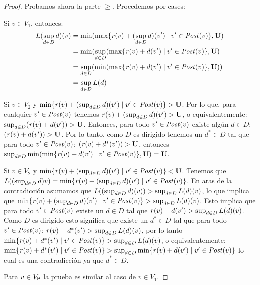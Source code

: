 \begin{proof}
    Probamos ahora la parte $\geq$.   Procedemos por cases:
    
    Si   $v \in V_1$,  entonces:
     \begin{align}
     L (\sup_{d \in D} d)(v) & = \min ( \max \{ \mathit{r}(v) + (\sup_{d \in D} d)(v') \mid v' \in \mathit{Post}(v)\},  \mathbf{U} ) \\                                                                                       
                                                     & =\min(  \sup_{d \in D} ( \max \{\mathit{r}(v) + d(v') \mid v' \in \mathit{Post}(v) \}, \mathbf{U} ) \\
                                                     & = \sup_{d \in D} (\min( \max \{ \mathit{r}(v) + d(v') \mid v' \in \mathit{Post}(v) \}, \mathbf{U})) \\
                                                     & =  \sup_{d \in D} L(d)
    \end{align}
    
    Si $v \in V_2$  y $\min \{ \mathit{r}(v) + (\sup_{d \in D} d)(v') \mid v' \in \mathit{Post}(v)\} > \mathbf{U}$. Por lo que, para
    cualquier $v' \in \mathit{Post}(v)$ tenemos  $\mathit{r}(v) + (\sup_{d \in D} d)(v') > \mathbf{U}$, o equivalentemente: 
    $\sup_{d \in D} (\mathit{r}(v) + d(v')) > \mathbf{U}$. Entonces, para todo $v' \in \mathit{Post}(v)$ existe algún $d \in D$: $(\mathit{r}(v) + d(v')) > \mathbf{U}$.
    Por lo tanto, como $D$ es dirigido tenemos un $d^* \in D$ tal que para todo $v' \in \mathit{Post}(v)$: $(\mathit{r}(v) + d^*(v')) > \mathbf{U}$, entonces 
    $\sup_{d \in D} \min ( \min \{ \mathit{r}(v) + d(v') \mid v' \in \mathit{Post}(v)\}, \mathbf{U}) = \mathbf{U}$.
     
     Si $v \in V_2$  y $\min \{ \mathit{r}(v) + (\sup_{d \in D} d)(v') \mid v' \in \mathit{Post}(v)\} < \mathbf{U}$.  Tenemos que
     $L((\sup_{d \in D} d) v) = \min \{ \mathit{r}(v) + (\sup_{d \in D} d)(v') \mid v' \in \mathit{Post}(v)\}$. En aras de la contradicción asumamos que $L((\sup_{d \in D} d)(v)) > \sup_{d \in D} L(d)(v)$, lo que implica que
    $\min \{ \mathit{r}(v) + (\sup_{d \in D} d)(v') \mid v' \in \mathit{Post}(v)\} > \sup_{d \in D} L(d)(v)$. Esto implica
    que para todo $v' \in \mathit{Post}(v)$ existe un $d \in D$ tal que  $\mathit{r}(v) + d(v')  > \sup_{d \in D} L(d)(v)$.
    Como $D$ es dirigido esto significa que existe un $d^* \in D$ tal que para todo $v' \in \mathit{Post}(v)$: $\mathit{r}(v) + d^*(v')  > \sup_{d \in D} L(d)(v)$,
    por lo tanto $\min \{ \mathit{r}(v) + d^*(v') \mid v' \in \mathit{Post}(v)  \} > \sup_{d \in D} L(d)(v)$, o equivalentemente:
    $\min \{ \mathit{r}(v) + d^*(v') \mid v' \in \mathit{Post}(v)  \} > \sup_{d \in D} \min \{ \mathit{r}(v) + d(v') \mid v' \in \mathit{Post}(v)\}$ lo cual es una contradicción ya que $d^* \in D$.
     
    Para $v \in V_{\mathsf{P}}$ la prueba es similar al caso de $v \in V_1$.\qedhere
\end{proof} \\ 